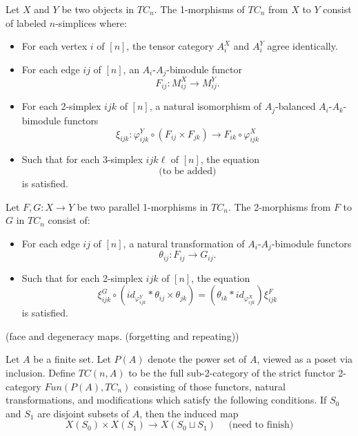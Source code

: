 \documentclass{amsart}
\begin{document}
Let $X$ and $Y$ be two objects in $TC_n$. The 1-morphisms of $TC_n$ from $X$ to $Y$ consist of labeled $n$-simplices where:
\begin{itemize}
	\item For each vertex $i$ of $[n]$, the tensor category $A_i^X$ and $A^Y_i$ agree identically. 
	\item For each edge $ij$ of $[n]$, an $A_i$-$A_j$-bimodule functor 
	\begin{equation*}
		F_{ij}: M_{ij}^X \to M_{ij}^Y.
	\end{equation*}
	\item For each 2-simplex $ijk$ of $[n]$, a natural isomorphism of $A_j$-balanced $A_i$-$A_k$-bimodule functors
	\begin{equation*}
		\xi_{ijk}: \varphi_{ijk}^Y \circ (F_{ij} \times F_{jk}) \to F_{ik} \circ \varphi_{ijk}^X
	\end{equation*}
	\item Such that for each 3-simplex $ijk\ell$ of $[n]$, the equation
	\begin{equation*}
			\text{(to be added)}
	\end{equation*}
	is satisfied.
\end{itemize} 
Let $F,G: X \to Y$ be two parallel 1-morphisms in $TC_n$. The 2-morphisms from $F$ to $G$ in $TC_n$ consist of:
\begin{itemize}
	\item For each edge $ij$ of $[n]$, a natural transformation of $A_i$-$A_j$-bimodule functors
	\begin{equation*}
		\theta_{ij}: F_{ij} \to G_{ij}.
	\end{equation*}
	\item Such that for each 2-simplex $ijk$ of $[n]$, the equation
	\begin{equation*}
		\xi_{ijk}^G \circ (  id_{\varphi_{ijk}^Y} * \theta_{ij} \times \theta_{jk}) = (\theta_{ik} * id_{\varphi_{ijk}^X} ) \xi_{ijk}^F
	\end{equation*}
	is satisfied. 
\end{itemize}


(face and degeneracy maps. (forgetting and repeating))

Let $A$ be a finite set. Let $P(A)$ denote the power set of $A$, viewed as a poset via inclusion. Define $TC(n,A)$ to be the full sub-2-category of the strict functor 2-category $Fun(P(A), TC_n)$ consisting of those functors, natural transformations, and modifications which satisfy the following conditions. If $S_0$ and $S_1$ are disjoint subsets of $A$, then the induced map 
\begin{equation*}
	X(S_0) \times X(S_1) \to X(S_0 \sqcup S_1) \quad \text{ (need to finish)}
\end{equation*} 
\end{document}
